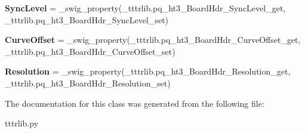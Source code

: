 \begin{DoxyCompactItemize}
{\bfseries Sync\+Level} = \+\_\+swig\+\_\+property(\+\_\+tttrlib.\+pq\+\_\+ht3\+\_\+\+Board\+Hdr\+\_\+\+Sync\+Level\+\_\+get, \+\_\+tttrlib.\+pq\+\_\+ht3\+\_\+\+Board\+Hdr\+\_\+\+Sync\+Level\+\_\+set)
\item 
\mbox{\label{classtttrlib_1_1pq__ht3___board_hdr_a7b884a6429dd17ced60eb0cb845c5cc7}} 
{\bfseries Curve\+Offset} = \+\_\+swig\+\_\+property(\+\_\+tttrlib.\+pq\+\_\+ht3\+\_\+\+Board\+Hdr\+\_\+\+Curve\+Offset\+\_\+get, \+\_\+tttrlib.\+pq\+\_\+ht3\+\_\+\+Board\+Hdr\+\_\+\+Curve\+Offset\+\_\+set)
\item 
\mbox{\label{classtttrlib_1_1pq__ht3___board_hdr_a41165259f40b940f39b6ce4aa1dabccc}} 
{\bfseries Resolution} = \+\_\+swig\+\_\+property(\+\_\+tttrlib.\+pq\+\_\+ht3\+\_\+\+Board\+Hdr\+\_\+\+Resolution\+\_\+get, \+\_\+tttrlib.\+pq\+\_\+ht3\+\_\+\+Board\+Hdr\+\_\+\+Resolution\+\_\+set)
\end{DoxyCompactItemize}


The documentation for this class was generated from the following file\+:\begin{DoxyCompactItemize}
\item 
tttrlib.\+py\end{DoxyCompactItemize}
